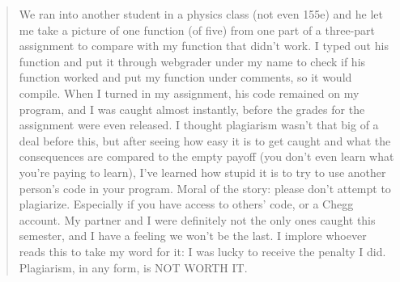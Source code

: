 \documentclass[12pt]{scrartcl}
\begin{document}
\begin{quote}
	We ran into another student in a physics class (not even 155e) and he let me take a picture of one function (of five) from one part of a three-part assignment to compare with my function that didn't work. I typed out his function and put it through webgrader under my name to check if his function worked and put my function under comments, so it would compile. When I turned in my assignment, his code remained on my program, and I was caught almost instantly, before the grades for the assignment were even released. I thought plagiarism wasn't that big of a deal before this, but after seeing how easy it is to get caught and what the consequences are compared to the empty payoff (you don't even learn what you're paying to learn), I've learned how stupid it is to try to use another person's code in your program. Moral of the story: please don't attempt to plagiarize. Especially if you have access to others' code, or a Chegg account. My partner and I were definitely not the only ones caught this semester, and I have a feeling we won't be the last. I implore whoever reads this to take my word for it: I was lucky to receive the penalty I did. Plagiarism, in any form, is NOT WORTH IT.
\end{quote}
\end{document}
